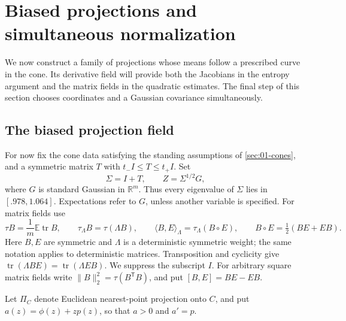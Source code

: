 \section{Biased projections and simultaneous normalization}\label{sec:02-projections}

We now construct a family of projections whose means follow a prescribed curve in the cone. Its derivative field will provide both the Jacobians in the entropy argument and the matrix fields in the quadratic estimates. The final step of this section chooses coordinates and a Gaussian covariance simultaneously.

\subsection{The biased projection field}
For now fix the cone data satisfying the standing assumptions of \cref{sec:01-cones}, and a symmetric matrix $T$ with $t_-I\le T\le t_+I$. Set
\[
\Sigma=I+T,\qquad Z=\Sigma^{1/2}G,
\]
where $G$ is standard Gaussian in $\mathbb{R}^m$. Thus every eigenvalue of $\Sigma$ lies in $[.978,1.064]$. Expectations refer to $G$, unless another variable is specified. For matrix fields use
\[
\tau B=\frac1m\mathbb{E}\operatorname{tr}B,\qquad
\tau_\Lambda B=\tau(\Lambda B),\qquad
\langle B,E\rangle_\Lambda=\tau_\Lambda(B\circ E),\qquad
B\circ E=\tfrac12(BE+EB).
\]
Here $B,E$ are symmetric and $\Lambda$ is a deterministic symmetric weight; the same notation applies to deterministic matrices. Transposition and cyclicity give $\operatorname{tr}(\Lambda BE)=\operatorname{tr}(\Lambda EB)$. We suppress the subscript $I$. For arbitrary square matrix fields write $\|B\|_2^2=\tau(B^{\mathsf T}B)$, and put $[B,E]=BE-EB$.

Let $\Pi_C$ denote Euclidean nearest-point projection onto $C$, and put $a(z)=\phi(z)+zp(z)$, so that $a>0$ and $a'=p$.

